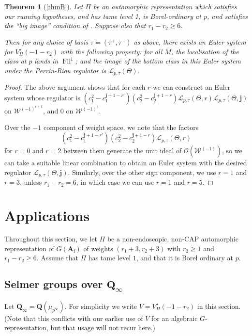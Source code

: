\documentclass[cjm]{ipart}
\theoremstyle{plain}
\newtheorem{theorem}{Theorem}[subsection]
\theoremstyle{remark}
\DeclareMathOperator{\Fil}{Fil}
\newcommand{\Af}{\AA_{\mathrm{f}}}
\newcommand{\QQ}{\mathbf{Q}}
\newcommand{\bfj}{\mathbf{j}}
\newcommand{\cL}{\mathcal{L}}
\newcommand{\cO}{\mathcal{O}}
\newcommand{\cW}{\mathcal{W}}
\renewcommand{\AA}{\mathbf{A}}
\numberwithin{equation}{subsection}
\renewcommand{\ge}{\geqslant}
\begin{document}
  \begin{theorem}[{\cref{thmB}}]
   \label{thm:explicitrecip}
   Let $\Pi$ be an automorphic representation which satisfies our running hypotheses, and has tame level 1, is Borel-ordinary at $p$, and satisfies the ``big image'' condition of \cite[Assumption 11.1.2]{LSZ17}. Suppose also that $r_1 - r_2 \ge 6$.

   Then for any choice of basis $\tau = (\tau^+, \tau^-)$ as above, there exists an Euler system for $V_{\Pi}^\star(-1-r_2)$ with the following property: for all $M$, the localisation of the class at $p$ lands in $\Fil^1$; and the image of the bottom class in this Euler system under the Perrin-Riou regulator is $\cL_{p, \tau}(\Theta)$.
  \end{theorem}

  \begin{proof}
   The above argument shows that for each $r$ we can construct an Euler system whose regulator is $(c_1^2 - c_1^{\bfj + 1-r'})(c_2^2 - c_2^{\bfj+1-r}) \cL_{p,\tau}(\Theta, r) \cL_{p, \tau}(\Theta, \bfj)$ on $\cW^{(-1)^{r+1}}$, and 0 on $\cW^{(-1)^{r}}$.

   Over the $-1$ component of weight space, we note that the factors
   \[ (c_1^2 - c_1^{\bfj + 1-r'})(c_2^2 - c_2^{\bfj+1-r}) \cL_{p,\tau}(\Theta, r)\]
   for $r = 0$ and $r = 2$ between them generate the unit ideal of $\cO(\cW^{(-1)})$, so we can take a suitable linear combination to obtain an Euler system with the desired regulator $\cL_{p, \tau}(\Theta, \bfj)$. Similarly, over the other sign component, we use $r=1$ and $r = 3$, unless $r_1 - r_2 = 6$, in which case we can use $r=1$ and $r=5$.
  \end{proof}



\section{Applications}

 Throughout this section, we let $\Pi$ be a non-endoscopic, non-CAP automorphic representation of $G(\Af)$ of weights $(r_1+3,r_2+3)$ with $r_2 \ge 1$ and $r_1-r_2\ge 6$. Assume that $\Pi$ has tame level $1$, and that it is Borel ordinary at $p$.

 \subsection{Selmer groups over $\QQ_{\infty}$}

  Let $\QQ_\infty = \QQ(\mu_{p^\infty})$. For simplicity we write $V = V_{\Pi}^\star(-1-r_2)$ in this section. (Note that this conflicts with our earlier use of $V$ for an algebraic $G$-representation, but that usage will not recur here.)
\end{document}
